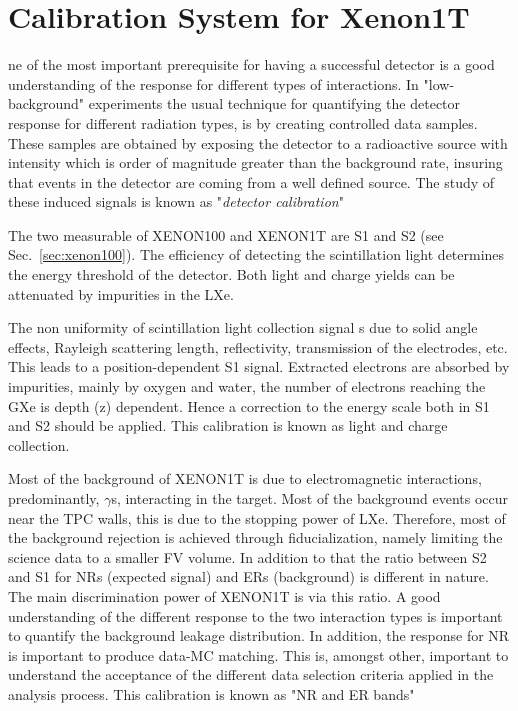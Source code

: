 %
%
\let\textcircled=\pgftextcircled

\chapter{Calibration System for Xenon1T} \label{chap:calib}
\label{chap:calibration}
ne of the most important prerequisite for having a successful detector is a good understanding of the response for different types of interactions. In "low-background" experiments the usual technique for quantifying the detector response for different radiation types, is by creating controlled data samples. These samples are obtained by exposing the detector to a radioactive source with intensity which is order of magnitude greater than the background rate, insuring that events in the detector are coming from a well defined source. The study of these induced signals is known as "\textit{detector calibration}" 

The two measurable of XENON100 and XENON1T are S1 and S2 (see Sec.~\ref{sec:xenon100}). The efficiency of detecting the scintillation light determines the energy threshold of the detector. Both light and charge yields can be attenuated by impurities in the LXe. 

The non uniformity of scintillation light collection signal s due to solid angle effects, Rayleigh scattering length, reflectivity, transmission of the electrodes, etc. This leads to a
position-dependent S1 signal. Extracted electrons are absorbed by impurities, mainly by oxygen and water, the number of electrons reaching the GXe is depth (z) dependent. Hence a correction to the energy scale both in S1 and S2 should be applied. This calibration is known as light and charge collection. 

Most of the background of XENON1T is due to electromagnetic interactions, predominantly, $\gamma$s, interacting in the target. Most of the background events occur near the TPC walls, this is due to the stopping power of LXe. Therefore, most of the background rejection is achieved through fiducialization, namely limiting the science data to a smaller FV volume. In addition to that the ratio between S2 and S1 for NRs (expected signal) and ERs (background) is different in nature. The main discrimination power of XENON1T is via this ratio. A good understanding of the different response to the two interaction types is important to quantify the background leakage distribution. In addition, the response for NR is important to produce data-MC matching. This is, amongst other, important to understand the acceptance of the different data selection criteria applied in the analysis process. This calibration is known as "NR and ER bands"    

